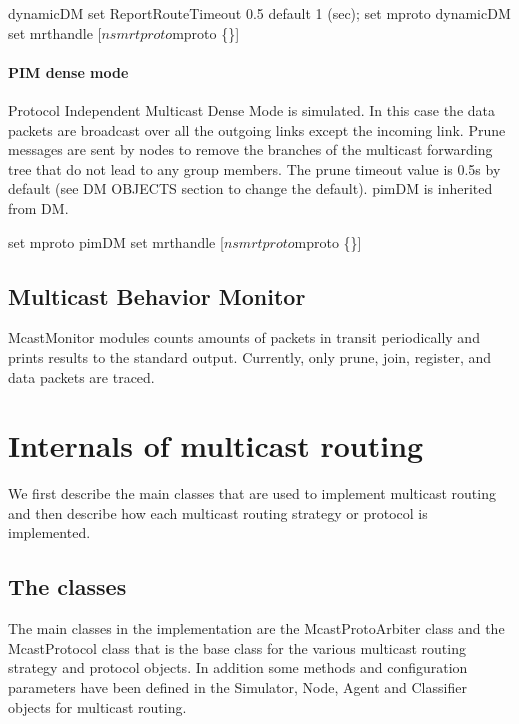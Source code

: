 \begin{program}
	dynamicDM set ReportRouteTimeout 0.5  \; default 1 (sec);
	set mproto dynamicDM
	set mrthandle [$ns mrtproto $mproto \{\}]
\end{program}

\paragraph{PIM dense mode}
Protocol Independent Multicast Dense Mode is simulated. 
In this case the data packets are broadcast over all the outgoing 
links except the incoming link. Prune messages are sent by nodes to 
remove the branches of the multicast forwarding tree that do not 
lead to any group members. The prune timeout value is 0.5s by
default (see DM OBJECTS section to change the default). pimDM is inherited from DM.

\begin{program}
	set mproto pimDM
	set mrthandle [$ns mrtproto $mproto \{\}]
\end{program}

\subsection{Multicast Behavior Monitor}
McastMonitor modules counts amounts of packets in transit periodically and prints results to the standard output.  Currently, only prune, join, register, and data packets are traced.  


\section{Internals of multicast routing}
\label{sec:mcast-internals}

We first describe the main classes that are used to implement multicast routing and then describe how each multicast routing strategy
or protocol is implemented.

\subsection{The classes}
The main classes in the implementation are
the McastProtoArbiter class and the McastProtocol class that is the base class for the various multicast routing strategy and protocol objects.
In addition some methods and configuration parameters have been defined in the Simulator, Node, Agent and Classifier objects for multicast routing.

